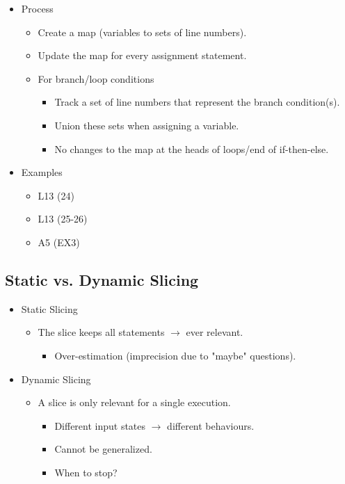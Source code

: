 \documentclass{article}
\begin{document}
\begin{itemize}
    \item Process
    \begin{itemize}
        \item Create a map (variables to sets of line numbers).
        \item Update the map for every assignment statement.
        \item For branch/loop conditions
        \begin{itemize}
            \item Track a set of line numbers that represent the branch condition(s).
            \item Union these sets when assigning a variable.
            \item No changes to the map at the heads of loops/end of if-then-else.
        \end{itemize}
    \end{itemize}
    \item Examples
    \begin{itemize}
        \item L13 (24)
        \item L13 (25-26)
        \item A5 (EX3)
    \end{itemize}
\end{itemize}

\subsection{Static vs. Dynamic Slicing}

\begin{itemize}
    \item Static Slicing
    \begin{itemize}
        \item The slice keeps all statements $\rightarrow$ ever relevant.
        \begin{itemize}
            \item Over-estimation (imprecision due to "maybe" questions).
        \end{itemize}
    \end{itemize}
    \item Dynamic Slicing
    \begin{itemize}
        \item A slice is only relevant for a single execution.
        \begin{itemize}
            \item Different input states $\rightarrow$ different behaviours.
            \item Cannot be generalized.
            \item When to stop?
        \end{itemize}
    \end{itemize}
\end{itemize}
\end{document}
